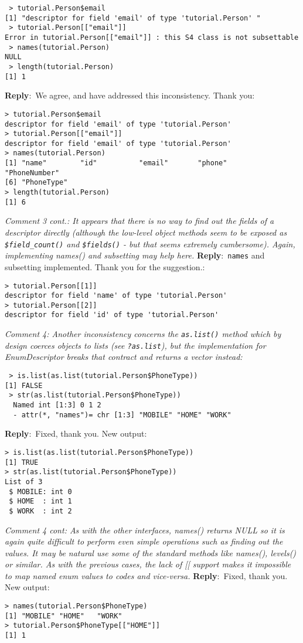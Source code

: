 \documentclass[10pt]{article}
\newcommand{\pointRaised}[2]{\smallskip %
  \textsl{{\fontseries{b}\selectfont #1}: #2}\newline}
\newcommand{\reply}[1]{\textbf{Reply}:\ #1 \smallskip } %
\begin{document}
\begin{verbatim}
 > tutorial.Person$email
[1] "descriptor for field 'email' of type 'tutorial.Person' "
 > tutorial.Person[["email"]]
Error in tutorial.Person[["email"]] : this S4 class is not subsettable
 > names(tutorial.Person)
NULL
 > length(tutorial.Person)
[1] 1
\end{verbatim}
\reply{We agree, and have addressed this inconsistency.  Thank you:}
\begin{verbatim}
> tutorial.Person$email
descriptor for field 'email' of type 'tutorial.Person' 
> tutorial.Person[["email"]]
descriptor for field 'email' of type 'tutorial.Person' 
> names(tutorial.Person)
[1] "name"        "id"          "email"       "phone"       "PhoneNumber"
[6] "PhoneType"  
> length(tutorial.Person)
[1] 6
\end{verbatim}

\pointRaised{Comment 3 cont.}{It appears that there is no way to find out the fields of a descriptor 
  directly (although the low-level object methods seem to be exposed as 
  \texttt{\$field\_count()} and \texttt{\$fields()} - but that seems extremely cumbersome). 
  Again, implementing names() and subsetting may help here.}
\reply{\texttt{names} and subsetting implemented.  Thank you for the
  suggestion.:}
\begin{verbatim}
> tutorial.Person[[1]]
descriptor for field 'name' of type 'tutorial.Person' 
> tutorial.Person[[2]]
descriptor for field 'id' of type 'tutorial.Person' 
\end{verbatim}

\pointRaised{Comment 4}{Another inconsistency concerns the \texttt{as.list()} method which by design 
  coerces objects to lists (see \texttt{?as.list}), but the implementation for 
  EnumDescriptor breaks that contract and returns a vector instead:}

\begin{verbatim}
 > is.list(as.list(tutorial.Person$PhoneType))
[1] FALSE
 > str(as.list(tutorial.Person$PhoneType))
  Named int [1:3] 0 1 2
  - attr(*, "names")= chr [1:3] "MOBILE" "HOME" "WORK"
\end{verbatim}

\reply{Fixed, thank you. New output:}
\begin{verbatim}
> is.list(as.list(tutorial.Person$PhoneType))
[1] TRUE
> str(as.list(tutorial.Person$PhoneType))
List of 3
 $ MOBILE: int 0
 $ HOME  : int 1
 $ WORK  : int 2
\end{verbatim}

\pointRaised{Comment 4 cont}{As with the other interfaces, names() returns NULL so it is again quite
  difficult to perform even simple operations such as finding out the 
  values. It may be natural use some of the standard methods like names(), 
  levels() or similar. As with the previous cases, the lack of [[ support
  makes it impossible to map named enum values to codes and vice-versa.}
\reply{Fixed, thank you.  New output:}
\begin{verbatim}
> names(tutorial.Person$PhoneType)
[1] "MOBILE" "HOME"   "WORK"  
> tutorial.Person$PhoneType[["HOME"]]
[1] 1
\end{verbatim}
\end{document}
